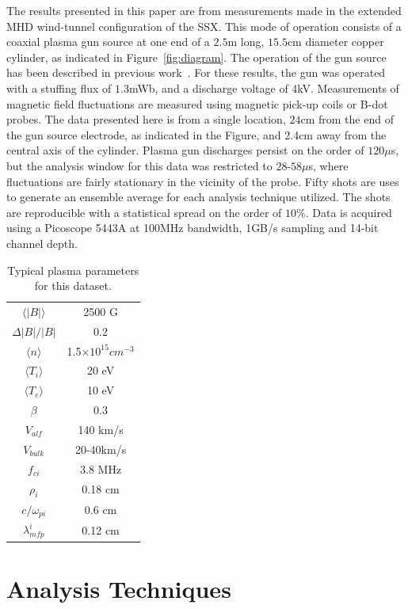 \documentclass[aip,pop,amsmath,amssymb,preprint,superscriptaddress]{revtex4-1} %
\begin{document}
The results presented in this paper are from measurements made in the extended MHD wind-tunnel configuration of the SSX. This mode of operation consists of a coaxial plasma gun source at one end of a $2.5$m long, $15.5$cm diameter copper cylinder, as indicated in Figure~\ref{fig:diagram}. The operation of the gun source has been described in previous work~\cite{brown2014}. For these results, the gun was operated with a stuffing flux of $1.3$mWb, and a discharge voltage of 4kV. Measurements of magnetic field fluctuations are measured using magnetic pick-up coils or B-dot probes. The data presented here is from a single location, $24$cm from the end of the gun source electrode, as indicated in the Figure, and 2.4cm away from the central axis of the cylinder. Plasma gun discharges persist on the order of $120\mu$s, but the analysis window for this data was restricted to $28$-$58\mu$s, where fluctuations are fairly stationary in the vicinity of the probe. Fifty shots are uses to generate an ensemble average for each analysis technique utilized. The shots are reproducible with a statistical spread on the order of $10\%$. Data is acquired using a Picoscope 5443A at 100MHz bandwidth, 1GB/s sampling and 14-bit channel depth.

\begin{table}
\begin{center}
\caption{\label{tab:params}Typical plasma parameters for this dataset.}
\begin{tabular}{cc}
$\langle |B|\rangle$&2500 G\\
$\Delta |B|/|B|$&0.2\\
$\langle n\rangle $&1.5$\times 10^{15} cm^{-3}$\\
$\langle T_{i}\rangle$&20 eV\\
$\langle T_{e}\rangle$&10 eV\\
$\beta$&0.3\\
$V_{alf}$&140 km/s\\
$V_{bulk}$&20-40km/s\\
$f_{ci}$&3.8 MHz\\
$\rho_{i}$&0.18 cm\\
$c/\omega_{pi}$&0.6 cm\\
$\lambda_{mfp}^{i}$&0.12 cm\\
\end{tabular}
\end{center}
\end{table}

\section{Analysis Techniques}
\end{document}
